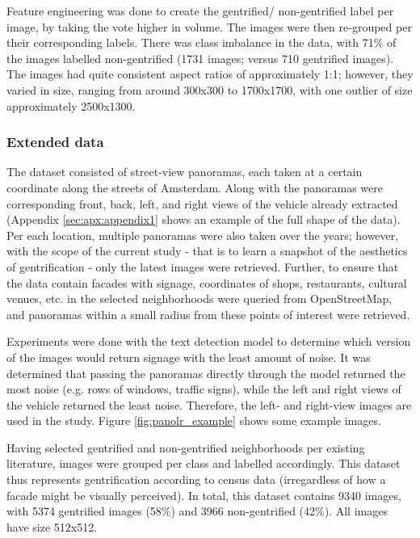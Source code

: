 Feature engineering was done to create the gentrified/ non-gentrified label per image, by taking the vote higher in volume. The images were then re-grouped per their corresponding labels. There was class imbalance in the data, with 71\% of the images labelled non-gentrified (1731 images; versus 710 gentrified images). The images had quite consistent aspect ratios of approximately 1:1; however, they varied in size, ranging from around 300x300 to 1700x1700, with one outlier of size approximately 2500x1300.


\subsubsection{Extended data}
The dataset consisted of street-view panoramas, each taken at a certain coordinate along the streets of Amsterdam. Along with the panoramas were corresponding front, back, left, and right views of the vehicle already extracted (Appendix \ref{sec:apx:appendix1} shows an example of the full shape of the data). Per each location, multiple panoramas were also taken over the years; however, with the scope of the current study - that is to learn a snapshot of the aesthetics of gentrification - only the latest images were retrieved. Further, to ensure that the data contain facades with signage, coordinates of shops, restaurants, cultural venues, etc. in the selected neighborhoods were queried from OpenStreetMap, and panoramas within a small radius from these points of interest were retrieved.

Experiments were done with the text detection model to determine which version of the images would return signage with the least amount of noise. It was determined that passing the panoramas directly through the model returned the most noise (e.g. rows of windows, traffic signs), while the left and right views of the vehicle returned the least noise. Therefore, the left- and right-view images are used in the study. Figure \ref{fig:panolr_example} shows some example images.

Having selected gentrified and non-gentrified neighborhoods per existing literature, images were grouped per class and labelled accordingly. This dataset thus represents gentrification according to census data (irregardless of how a facade might be visually perceived). In total, this dataset contains 9340 images, with 5374 gentrified images (58\%) and 3966 non-gentrified (42\%). All images have size 512x512.

